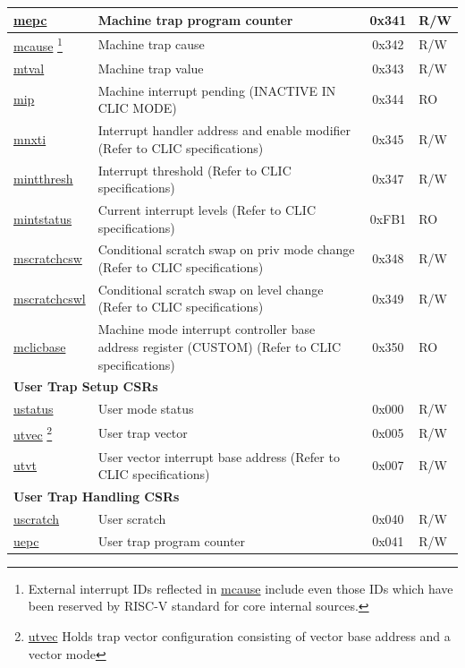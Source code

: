 \begin{longtable}{ | p{4.0cm} | p{8.4cm} | c | l | }
\hyperref[regdesc:MEPC]{mepc} & Machine trap program counter & 0x341 & R/W \\\hline
\hyperref[regdesc:MCAUSE]{mcause} \footnote{External interrupt IDs reflected in \hyperref[regdesc:MCAUSE]{mcause} include even those IDs which have been reserved by RISC-V standard for core internal sources.} & Machine trap cause & 0x342 & R/W \\\hline
\hyperref[regdesc:MTVAL]{mtval} & Machine trap value & 0x343 & R/W \\\hline
\hyperref[regdesc:MIP_REG]{mip} & Machine interrupt pending (INACTIVE IN CLIC MODE) & 0x344 & RO \\\hline
\hyperref[regdesc:MNXTI_REG]{mnxti} & Interrupt handler address and enable modifier (Refer to CLIC specifications) & 0x345 & R/W \\\hline
\hyperref[regdesc:MINTTHRESH]{mintthresh} & Interrupt threshold (Refer to CLIC specifications) & 0x347 & R/W \\\hline
\hyperref[regdesc:MINTSTATUS]{mintstatus} & Current interrupt levels (Refer to CLIC specifications) & 0xFB1 & RO \\\hline
\hyperref[regdesc:MSCRATCHCSW_REG]{mscratchcsw} & Conditional scratch swap on priv mode change (Refer to CLIC specifications) & 0x348 & R/W \\\hline
\hyperref[regdesc:MSCRATCHCSWL_REG]{mscratchcswl} & Conditional scratch swap on level change (Refer to CLIC specifications) & 0x349 & R/W \\\hline
\hyperref[regdesc:MCLICBASE_REG]{mclicbase} & Machine mode interrupt controller base address register (CUSTOM) (Refer to CLIC specifications) & 0x350 & RO \\\hline
\multicolumn{4}{|l|}{\textbf{User Trap Setup CSRs}} \\\hline
\hyperref[regdesc:USTATUS]{ustatus} & User mode status & 0x000 & R/W \\\hline
\hyperref[regdesc:UTVEC]{utvec} \footnote{\hyperref[regdesc:UTVEC]{utvec} Holds trap vector configuration consisting of vector base address and a vector mode} & User trap vector & 0x005 & R/W \\\hline
\hyperref[regdesc:UTVT]{utvt} & User vector interrupt base address (Refer to CLIC specifications) & 0x007 & R/W \\\hline
\multicolumn{4}{|l|}{\textbf{User Trap Handling CSRs}} \\\hline
\hyperref[regdesc:USCRATCH]{uscratch} & User scratch & 0x040 & R/W \\\hline
\hyperref[regdesc:UEPC]{uepc} & User trap program counter & 0x041 & R/W \\\hline

\end{longtable}
